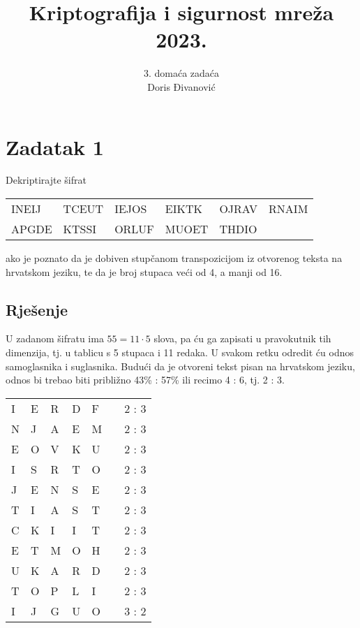 \documentclass[a4paper,12pt,oneside]{article}
\title{Kriptografija i sigurnost mreža 2023.}
\author{ 3. domaća zadaća \\ Doris Đivanović }
\date{}
\begin{document}
	\maketitle
\section*{Zadatak 1}
Dekriptirajte šifrat
\begin{table}[h!]
	\begin{tabular}{llllll}
		INEIJ & TCEUT & IEJOS & EIKTK & OJRAV & RNAIM \\
		APGDE & KTSSI & ORLUF & MUOET & THDIO & \\
	\end{tabular}
\end{table}

\noindent ako je poznato da je dobiven stupčanom transpozicijom iz otvorenog
teksta na hrvatskom jeziku, te da je broj stupaca veći od 4, a manji
od 16.
\subsection*{Rješenje}
U zadanom šifratu ima $55 = 11 \cdot 5$ slova, pa ću ga zapisati u pravokutnik tih dimenzija, tj. u tablicu
s 5 stupaca i 11 redaka. U svakom retku odredit ću odnos samoglasnika i suglasnika. Budući da je otvoreni tekst pisan na hrvatskom jeziku, odnos bi trebao biti približno 43\% : 57\% ili recimo 4 : 6, tj. 2 : 3.

\begin{table}[h!]
	\begin{tabular}{lllllll}
		I & E & R & D & F & & 2 : 3\\
		N & J & A & E & M & & 2 : 3\\
		E & O & V & K & U & & 2 : 3\\
		I & S & R & T & O & & 2 : 3\\
		J & E & N & S & E & & 2 : 3\\
		T & I & A & S & T & & 2 : 3\\
		C & K & I & I & T & & 2 : 3\\
	    E & T & M & O & H & & 2 : 3\\
	    U & K & A & R & D & & 2 : 3\\
	    T & O & P & L & I & & 2 : 3\\
	    I & J & G & U & O & & 3 : 2\\
	\end{tabular}
\end{table}
\end{document}
